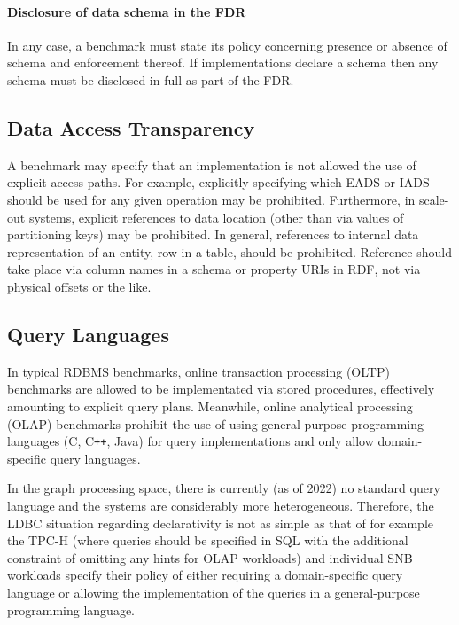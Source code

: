 \paragraph{Disclosure of data schema in the FDR}
In any case, a benchmark must state its policy concerning presence or absence of schema and enforcement thereof. If implementations declare a schema then any schema must be disclosed in full as part of the FDR.

\subsection{Data Access Transparency}

A benchmark may specify that an implementation is not allowed the use of explicit access paths. For example, explicitly specifying which EADS or IADS should be used for any given operation may be prohibited. Furthermore, in scale-out systems, explicit references to data location (other than via values of partitioning keys) may be prohibited. In general, references to internal data representation of an entity, \eg row in a table, should be prohibited. Reference should take place via column names in a schema or property URIs in RDF, not via physical offsets or the like.

\subsection{Query Languages}
\label{sec:query-languages}

In typical RDBMS benchmarks, online transaction processing (OLTP) benchmarks are allowed to be implementated via stored procedures, effectively amounting to explicit query plans.
Meanwhile, online analytical processing (OLAP) benchmarks prohibit the use of using general-purpose programming languages (\eg C, C\texttt{++}, Java) for query implementations and only allow domain-specific query languages.

In the graph processing space, there is currently (as of 2022) no standard query language and the systems are considerably more heterogeneous.
Therefore, the LDBC situation regarding declarativity is not as simple as that of for example the \mbox{TPC-H} (where queries should be specified in SQL with the additional constraint of omitting any hints for OLAP workloads) and individual SNB workloads specify their policy of either requiring a domain-specific query language or allowing the implementation of the queries in a general-purpose programming language.


